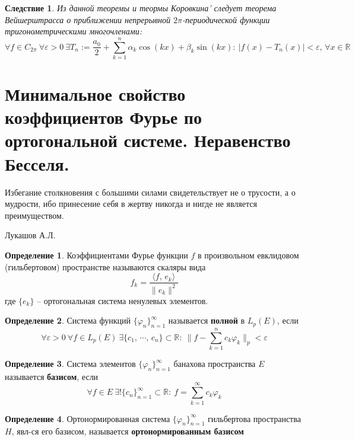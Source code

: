 \documentclass[a4paper,12pt]{article}
\renewcommand{\phi}{\ensuremath{\varphi}}
\theoremstyle{plain}
\newtheorem*{corollary}{Следствие}
\theoremstyle{definition}
\newtheorem{definition}{Определение}[section]
\theoremstyle{remark}
\begin{document}
\begin{corollary}
	Из данной теоремы и теормы Коровкина' следует теорема Вейшерштрасса о приближении непрерывной $2\pi$-периодической функции тригонометрическими многочленами:
	\[\forall f \in C_{2\pi} \: \forall \varepsilon > 0 \: \exists T_n := \frac{a_0}{2} + \sum_{k = 1}^n \alpha_k\cos(kx) + \beta_k\sin(kx) :\: |f(x) - T_n(x)| < \varepsilon,\, \forall x \in \mathbb{R}\]
\end{corollary}

\section{Минимальное свойство коэффициентов Фурье по ортогональной системе. Неравенство Бесселя.}

\epigraph{Избегание столкновения с большими силами свидетельствует не о трусости, а о мудрости, ибо принесение себя в жертву никогда и нигде не является преимуществом.}{Лукашов А.Л.}

\begin{definition}
	Коэффициентами Фурье функции $f$ в произвольном\newline
	евклидовом (гильбертовом) пространстве называются скаляры вида
	\[f_k = \frac{\langle f,\,e_k\rangle}{\|e_k\|^2}\]
	где $\{e_k\}$ -- ортогональная система ненулевых элементов.
\end{definition}

\begin{definition}
	Система функций $\{\phi_n\}_{n = 1}^\infty$ называется \textbf{полной} в $L_p(E)$, если 
	\[\forall \varepsilon > 0 \: \forall f \in L_p(E) \: \exists \{c_1,\,\cdots,\,c_n\} \subset \mathbb{R}:\: \|f - \sum_{k = 1}^n c_k\phi_k\|_p < \varepsilon\]
\end{definition}

\begin{definition}
	Система элементов $\{\phi_n\}_{n = 1}^\infty$ банахова пространства $E$ называется \textbf{базисом}, если
	\[\forall f \in E \: \exists! \{c_n\}_{n = 1}^\infty \subset \mathbb{R}:\: f = \sum_{k = 1}^\infty c_k\phi_k\]
\end{definition}

\begin{definition}
	Ортонормированная система $\{\phi_n\}_{n = 1}^\infty$ гильбертова пространства $H$, явл-ся его базисом, называется \textbf{ортонормированным базисом}
\end{definition}
\end{document}
